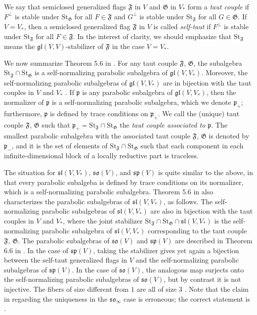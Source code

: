 \documentclass{amsart}
\theoremstyle{definition}
\theoremstyle{remark}
\numberwithin{equation}{section}
\newcommand {\St} {\mathrm{St}}
\def\gl{\mathfrak {gl}}
\def\p{\mathfrak {p}}
\def\sl{\mathfrak{sl}}
\def\so{\mathfrak{so}}
\def\sp{\mathfrak{sp}}
\def\F{\mathfrak{F}}
\def\G{\mathfrak{G}}
\begin{document}
We say that semiclosed generalized flags $\F$ in $V$ and $\G$ in $V_*$ form a \emph{taut couple} if $F^\perp$ is stable under $\St_\G$ for all $F \in \F$ and $G^\perp$ is stable under $\St_\F$ for all $G \in \G$.  If $V = V_*$, then a semiclosed generalized flag $\F$ in $V$ is called \emph{self-taut} if $F^\perp$ is stable under $\St_\F$ for all $F \in \F$.  In the interest of clarity, we should emphasize that $\St_\F$ means the $\gl(V,V)$-stabilizer of $\F$ in the case $V=V_*$.

We now summarize Theorem 5.6 in \cite{DP}.  For any taut couple $\F$, $\G$, the subalgebra $\St_\F \cap \St_\G$ is a self-normalizing parabolic subalgebra of $\gl(V,V_*)$.  Moreover, the self-normalizing parabolic subalgebras of $\gl(V,V_*)$ are in bijection with the taut couples in $V$ and $V_*$ \cite[Corollary 5.7]{DP}.  If $\p$ is any parabolic subalgebra of $\gl(V,V_*)$, then the normalizer of $\p$ is a self-normalizing parabolic subalgebra, which we denote $\p_+$; furthermore, $\p$ is defined by trace conditions on $\p_+$.  We call the (unique) taut couple $\F$, $\G$ such that $\p_+ = \St_\F \cap \St_\G$ the \emph{taut couple associated to $\p$}.  The smallest parabolic subalgebra with the associated taut couple $\F$, $\G$ is denoted by $\p_-$, and it is the set of elements of $\St_\F \cap \St_\G$ such that each component in each infinite-dimensional block of a locally reductive part is traceless.

The situation for $\sl(V,V_*)$, $\so(V)$, and $\sp(V)$ is quite similar to the above, in that every parabolic subalgeba is defined by trace conditions on its normalizer, which is a self-normalizing parabolic subalgebra.  Theorem 5.6 in \cite{DP} also characterizes the parabolic subalgebras of $\sl(V,V_*)$, as follows.  The self-normalizing parabolic subalgebras of $\sl(V,V_*)$ are also in bijection with the taut couples in $V$ and $V_*$, where the joint stabilizer $\St_\F \cap \St_\G \cap \sl(V,V_*)$ is the self-normalizing parabolic subalgebra of $\sl(V,V_*)$ corresponding to the taut couple $\F$, $\G$.  The parabolic subalgebras of $\so(V)$ and $\sp(V)$ are described in Theorem 6.6 in \cite{DP}. In the case of $\sp(V)$, taking the stabilizer gives yet again a bijection between the self-taut generalized flags in $V$ and the self-normalizing parabolic subalgebras of $\sp(V)$.  In the case of $\so(V)$, the analogous map surjects onto the self-normalizing parabolic subalgebras of $\so(V)$, but by contrast it is not injective.  The fibers of size different from $1$ are all of size $3$ \cite{DPWolf}.  Note that the claim in \cite[Theorem 6.6]{DP} regarding the uniqueness in the $\so_\infty$ case is erroneous; the correct statement is \cite[Theorem 2.8]{DPWolf}.
\end{document}
